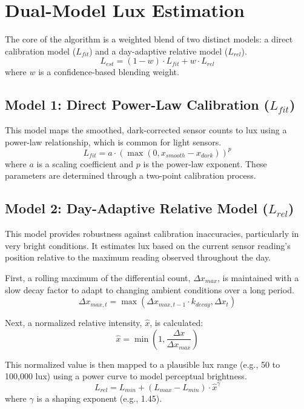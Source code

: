 \documentclass{article}
\begin{document}
\section{Dual-Model Lux Estimation}
The core of the algorithm is a weighted blend of two distinct models: a direct calibration model ($L_{fit}$) and a day-adaptive relative model ($L_{rel}$).
\begin{equation}
    L_{est} = (1 - w) \cdot L_{fit} + w \cdot L_{rel}
\end{equation}
where $w$ is a confidence-based blending weight.

\subsection{Model 1: Direct Power-Law Calibration ($L_{fit}$)}
This model maps the smoothed, dark-corrected sensor counts to lux using a power-law relationship, which is common for light sensors.
\begin{equation}
    L_{fit} = a \cdot (\max(0, x_{smooth} - x_{dark}))^p
\end{equation}
where $a$ is a scaling coefficient and $p$ is the power-law exponent. These parameters are determined through a two-point calibration process.

\subsection{Model 2: Day-Adaptive Relative Model ($L_{rel}$)}
This model provides robustness against calibration inaccuracies, particularly in very bright conditions. It estimates lux based on the current sensor reading's position relative to the maximum reading observed throughout the day.

First, a rolling maximum of the differential count, $\Delta x_{max}$, is maintained with a slow decay factor to adapt to changing ambient conditions over a long period.
\begin{equation}
    \Delta x_{max, t} = \max(\Delta x_{max, t-1} \cdot k_{decay}, \Delta x_t)
\end{equation}

Next, a normalized relative intensity, $\hat{x}$, is calculated:
\begin{equation}
    \hat{x} = \min\left(1, \frac{\Delta x}{\Delta x_{max}}\right)
\end{equation}

This normalized value is then mapped to a plausible lux range (e.g., 50 to 100,000 lux) using a power curve to model perceptual brightness.
\begin{equation}
    L_{rel} = L_{min} + (L_{max} - L_{min}) \cdot \hat{x}^{\gamma}
\end{equation}
where $\gamma$ is a shaping exponent (e.g., 1.45).
\end{document}
